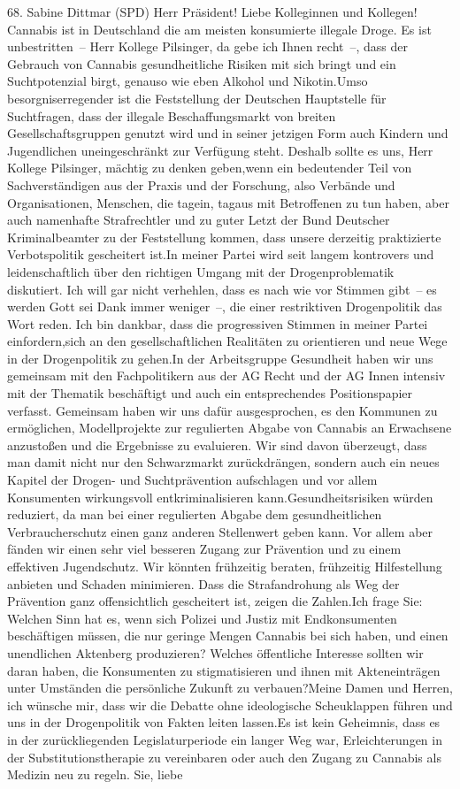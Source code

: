 \documentclass{article}
\begin{document}
	68. Sabine Dittmar (SPD) Herr Präsident! Liebe Kolleginnen und Kollegen! Cannabis ist in Deutschland die am meisten konsumierte illegale Droge. Es ist unbestritten – Herr Kollege ­Pilsinger, da gebe ich Ihnen recht –, dass der Gebrauch von Cannabis gesundheitliche Risiken mit sich bringt und ein Suchtpotenzial birgt, genauso wie eben Alkohol und Nikotin.Umso besorgniserregender ist die Feststellung der Deutschen Hauptstelle für Suchtfragen, dass der illegale Beschaffungsmarkt von breiten Gesellschaftsgruppen genutzt wird und in seiner jetzigen Form auch Kindern und Jugendlichen uneingeschränkt zur Verfügung steht. Deshalb sollte es uns, Herr Kollege Pilsinger, mächtig zu denken geben,wenn ein bedeutender Teil von Sachverständigen aus der Praxis und der Forschung, also Verbände und Organisationen, Menschen, die tagein, tagaus mit Betroffenen zu tun haben, aber auch namenhafte Strafrechtler und zu guter Letzt der Bund Deutscher Kriminalbeamter zu der Feststellung kommen, dass unsere derzeitig praktizierte Verbotspolitik gescheitert ist.In meiner Partei wird seit langem kontrovers und leidenschaftlich über den richtigen Umgang mit der Drogenproblematik diskutiert. Ich will gar nicht verhehlen, dass es nach wie vor Stimmen gibt – es werden Gott sei Dank immer weniger –, die einer restriktiven Drogenpolitik das Wort reden. Ich bin dankbar, dass die progressiven Stimmen in meiner Partei einfordern,sich an den gesellschaftlichen Realitäten zu orientieren und neue Wege in der Drogenpolitik zu gehen.In der Arbeitsgruppe Gesundheit haben wir uns gemeinsam mit den Fachpolitikern aus der AG Recht und der AG Innen intensiv mit der Thematik beschäftigt und auch ein entsprechendes Positionspapier verfasst. Gemeinsam haben wir uns dafür ausgesprochen, es den Kommunen zu ermöglichen, Modellprojekte zur regulierten Abgabe von Cannabis an Erwachsene anzustoßen und die Ergebnisse zu evaluieren. Wir sind davon überzeugt, dass man damit nicht nur den Schwarzmarkt zurückdrängen, sondern auch ein neues Kapitel der Drogen- und Suchtprävention aufschlagen und vor allem Konsumenten wirkungsvoll entkriminalisieren kann.Gesundheitsrisiken würden reduziert, da man bei einer regulierten Abgabe dem gesundheitlichen Verbraucherschutz einen ganz anderen Stellenwert geben kann. Vor allem aber fänden wir einen sehr viel besseren Zugang zur Prävention und zu einem effektiven Jugendschutz. Wir könnten frühzeitig beraten, frühzeitig Hilfestellung anbieten und Schaden minimieren. Dass die Strafandrohung als Weg der Prävention ganz offensichtlich gescheitert ist, zeigen die Zahlen.Ich frage Sie: Welchen Sinn hat es, wenn sich Polizei und Justiz mit Endkonsumenten beschäftigen müssen, die nur geringe Mengen Cannabis bei sich haben, und einen unendlichen Aktenberg produzieren? Welches öffentliche Interesse sollten wir daran haben, die Konsumenten zu stigmatisieren und ihnen mit Akteneinträgen unter Umständen die persönliche Zukunft zu verbauen?Meine Damen und Herren, ich wünsche mir, dass wir die Debatte ohne ideologische Scheuklappen führen und uns in der Drogenpolitik von Fakten leiten lassen.Es ist kein Geheimnis, dass es in der zurückliegenden Legislaturperiode ein langer Weg war, Erleichterungen in der Substitutionstherapie zu vereinbaren oder auch den Zugang zu Cannabis als Medizin neu zu regeln. Sie, liebe 
\end{document}
